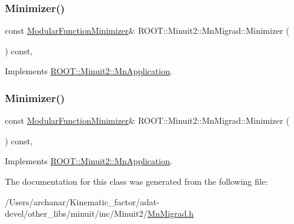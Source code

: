 \subsubsection{\texorpdfstring{Minimizer()}{Minimizer()}\hspace{0.1cm}{\footnotesize\ttfamily [2/3]}}
{\footnotesize\ttfamily const \mbox{\hyperlink{classROOT_1_1Minuit2_1_1ModularFunctionMinimizer}{Modular\+Function\+Minimizer}}\& R\+O\+O\+T\+::\+Minuit2\+::\+Mn\+Migrad\+::\+Minimizer (\begin{DoxyParamCaption}{ }\end{DoxyParamCaption}) const\hspace{0.3cm}{\ttfamily [inline]}, {\ttfamily [virtual]}}



Implements \mbox{\hyperlink{classROOT_1_1Minuit2_1_1MnApplication_a5a8e1e2658b731b5f4023dd1b1594223}{R\+O\+O\+T\+::\+Minuit2\+::\+Mn\+Application}}.

\mbox{\label{classROOT_1_1Minuit2_1_1MnMigrad_a98fa0ce74bf180a287093ac677e8644c}} 
\subsubsection{\texorpdfstring{Minimizer()}{Minimizer()}\hspace{0.1cm}{\footnotesize\ttfamily [3/3]}}
{\footnotesize\ttfamily const \mbox{\hyperlink{classROOT_1_1Minuit2_1_1ModularFunctionMinimizer}{Modular\+Function\+Minimizer}}\& R\+O\+O\+T\+::\+Minuit2\+::\+Mn\+Migrad\+::\+Minimizer (\begin{DoxyParamCaption}{ }\end{DoxyParamCaption}) const\hspace{0.3cm}{\ttfamily [inline]}, {\ttfamily [virtual]}}



Implements \mbox{\hyperlink{classROOT_1_1Minuit2_1_1MnApplication_a5a8e1e2658b731b5f4023dd1b1594223}{R\+O\+O\+T\+::\+Minuit2\+::\+Mn\+Application}}.



The documentation for this class was generated from the following file\+:\begin{DoxyCompactItemize}
\item 
/\+Users/archanar/\+Kinematic\+\_\+factor/adat-\/devel/other\+\_\+libs/minuit/inc/\+Minuit2/\mbox{\hyperlink{adat-devel_2other__libs_2minuit_2inc_2Minuit2_2MnMigrad_8h}{Mn\+Migrad.\+h}}\end{DoxyCompactItemize}
